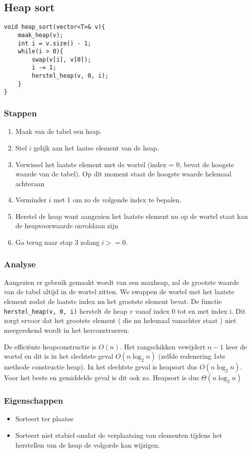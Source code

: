 \documentclass{report}
\begin{document}
\subsection{Heap sort}
\begin{lstlisting}
void heap_sort(vector<T>& v){
    maak_heap(v);
    int i = v.size() - 1;
    while(i > 0){
        swap(v[i], v[0]);
        i -= 1;
        herstel_heap(v, 0, i);
    }
}
\end{lstlisting}
\subsubsection{Stappen}
\begin{enumerate}
 \item Maak van de tabel een heap. 
 \item Stel $i$ gelijk aan het laatse element van de heap.
 \item Verwissel het laatste element met de wortel (index = 0, bevat de hoogste waarde van de tabel). Op dit moment staat de hoogste waarde helemaal achteraan
 \item Verminder $i$ met 1 om zo de volgende index te bepalen.
 \item Herstel de heap want aangezien het laatste element nu op de wortel staat kan de heapvoorwaarde onvoldaan zijn
 \item Ga terug naar stap 3 zolang $i >= 0$.
\end{enumerate}
\subsubsection{Analyse}
Aangezien er gebruik gemaakt wordt van een maxheap, zal de grootste waarde van de tabel altijd in de wortel zitten. We swappen de wortel met het laatste element zodat de laatste index nu het grootste element bevat. De functie \texttt{herstel\_heap(v, 0, i)} herstelt de heap $v$ vanaf index 0 tot en met index i. Dit zorgt ervoor dat het grootste element ( die nu helemaal vanachter staat ) niet meegerekend wordt in het herconstrueren.


De efficiënte heapconstructie is $O(n)$. Het rangschikken vewijdert $n - 1$ keer de wortel en dit is in het slechtste geval $O(n \log_2 n)$ (zelfde redenering 1ste methode constructie heap). In het slechtste geval is heapsort dus $O(n \log_2 n)$. Voor het beste en gemiddelde geval is dit ook zo. Heapsort is dus $\Theta(n \log_2 n)$
\subsubsection{Eigenschappen}
\begin{itemize}
 \item Sorteert ter plaatse
 \item Sorteert niet stabiel omdat de verplaatsing van elementen tijdens het herstellen van de heap de volgorde kan wijzigen.
\end{itemize}
\end{document}
